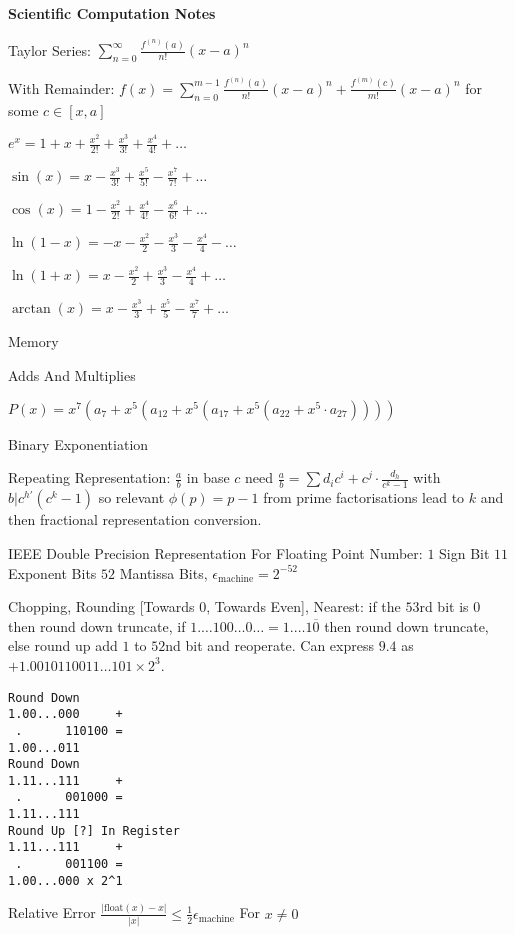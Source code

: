 \Large
\twocolumn

\textbf{Scientific Computation Notes}

Taylor Series: $\sum_{n=0}^{\infty} \frac{f^{(n)}(a)}{n!} (x-a)^n$

With Remainder: $f(x)=\sum_{n=0}^{m-1} \frac{f^{(n)}(a)}{n!} (x-a)^n + \frac{f^{(m)}(c)}{m!} (x-a)^n$ for some $c \in [x,a]$

$e^x = 1+x+\frac{x^2}{2!}+\frac{x^3}{3!}+\frac{x^4}{4!}+\dots$

$\sin(x) = x-\frac{x^3}{3!}+\frac{x^5}{5!}-\frac{x^7}{7!}+\dots$

$\cos(x) = 1-\frac{x^2}{2!}+\frac{x^4}{4!}-\frac{x^6}{6!}+\dots$

$\ln (1-x) = -x-\frac{x^2}{2}-\frac{x^3}{3}-\frac{x^4}{4}-\dots$

$\ln (1+x) = x-\frac{x^2}{2}+\frac{x^3}{3}-\frac{x^4}{4}+\dots$

$\arctan (x) = x-\frac{x^3}{3}+\frac{x^5}{5}-\frac{x^7}{7}+\dots$

Memory

Adds And Multiplies

$P(x)=x^7(a_7+x^5(a_{12}+x^5(a_{17}+x^5(a_{22}+x^5 \cdot a_27))))$

Binary Exponentiation

Repeating Representation: $\frac{a}{b}$ in base $c$ need $\frac{a}{b}=\sum d_i c^i + c^j \cdot \frac{d_h}{c^k-1}$ with $b | c^{h'}(c^k-1)$ so relevant $\phi (p) = p-1$ from prime factorisations lead to $k$ and then fractional representation conversion.

IEEE Double Precision Representation For Floating Point Number: $1$ Sign Bit $11$ Exponent Bits $52$ Mantissa Bits, $\epsilon_{\text{machine}} = 2^{-52}$

Chopping, Rounding [Towards 0, Towards Even], Nearest: if the $53$rd bit is $0$ then round down truncate, if $1.\dots 100 \dots 0 \dots = 1.\dots 1 \overline{0}$ then round down truncate, else round up add $1$ to $52$nd bit and reoperate. Can express $9.4$ as $+1.0010110011 \dots 101 \times 2^3$.

\begin{verbatim}
Round Down
1.00...000     +
 .      110100 =
1.00...011
Round Down
1.11...111     +
 .      001000 =
1.11...111
Round Up [?] In Register
1.11...111     +
 .      001100 =
1.00...000 x 2^1
\end{verbatim}

Relative Error $\frac{|\text{float}(x)-x|}{|x|} \le \frac{1}{2} \epsilon_{\text{machine}}$ For $x \neq 0$

